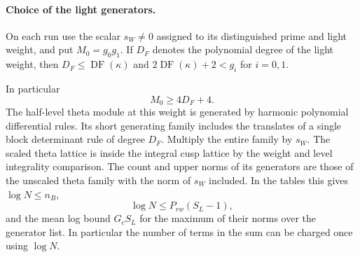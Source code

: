 \paragraph{Choice of the light generators.}
On each run use the scalar \(s_W\ne0\) assigned to its
distinguished prime and light weight, and put
\(M_0=g_0g_1\). If \(D_F\) denotes the polynomial degree
of the light weight, then \(D_F\le\operatorname{DF}(\kappa)\)
and \(2\operatorname{DF}(\kappa)+2<g_i\) for \(i=0,1\).

In particular 
\[
  M_0\ge4D_F+4.
\]
 The half-level theta
module at this weight is generated by harmonic polynomial
differential rules. Its short generating family includes
the translates of a single block determinant rule of
degree \(D_F\). Multiply the entire family by \(s_W\).
The scaled theta lattice is inside the integral cusp
lattice by the weight and level integrality comparison.
The count and upper norms of its generators are those of
the unscaled theta family with the norm of \(s_W\) included.
In the tables this gives
\(\log N\le n_B\), 
\[
  \log N\le P_{rw}(S_L-1),
\]
 and the
mean log bound \(G_c S_L\) for the maximum of their
norms over the generator list. In particular the number
of terms in the sum can be charged once using \(\log N\).
\label{cor:slice-light-1}

